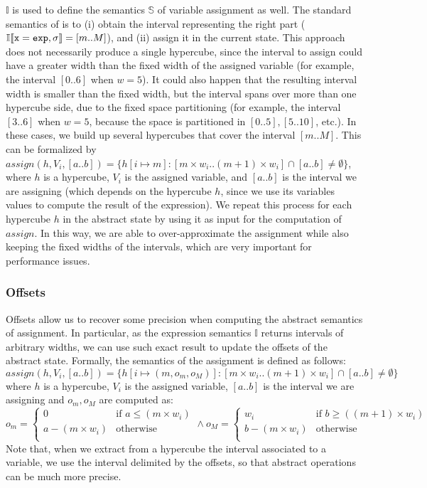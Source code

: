 $\mathbb{I}$ is used to define the semantics $\mathbb{S}$ of variable assignment as well. The standard semantics of  is to (i) obtain the interval representing the right part ($\mathbb{I}\llbracket\mathtt{x=exp}, \sigma\rrbracket=[m..M]$), and (ii) assign it in the current state. This approach does not necessarily produce a single hypercube, since the interval to assign could have a greater width than the fixed width of the assigned variable (for example, the interval $[0..6]$ when $w=5$). It could also happen that the resulting interval width is smaller than the fixed width, but the interval spans over more than one hypercube side, due to the fixed space partitioning (for example, the interval $[3..6]$ when $w=5$, because the space is partitioned in $[0..5],[5..10]$, etc.). In these cases, we build up several hypercubes that cover the interval $[m..M]$. This can be formalized by $assign(h, V_i, [a..b])=\{h[i\mapsto m] : [m\times w_i .. (m+1)\times w_i]\cap [a..b] \neq \emptyset\}$, where $h$ is a hypercube, $V_i$ is the assigned variable, and $[a..b]$ is the interval we are assigning (which depends on the hypercube $h$, since we use its variables values to compute the result of the expression). We repeat this process for each hypercube $h$ in the abstract state by using it as input for the computation of $assign$.
In this way, we are able to over-approximate the assignment while also keeping the fixed widths of the intervals, which are very important for performance issues.

\vspace{-10pt}
\subsubsection{Offsets}
Offsets allow us to recover some precision when computing the abstract semantics of assignment. In particular, as the expression semantics $\mathbb{I}$ returns intervals of arbitrary widths, we can use such exact result to update the offsets of the abstract state. Formally, the semantics of the assignment is defined as follows: 
\begin{equation*}
assign(h, V_i, [a..b]) = \{ h[i\mapsto (m,o_m,o_M)] : [m\times w_i .. (m+1)\times w_i] \cap [a..b] \neq \emptyset \}
\end{equation*}
where $h$ is a hypercube, $V_i$ is the assigned variable, $[a..b]$ is the interval we are assigning and $o_m, o_M$ are computed as:
\begin{equation*}
o_m = \begin{cases} 
0 & \mbox{if } a \leq (m \times w_i) \\
a - (m \times w_i) & \mbox{otherwise} \\
\end{cases} \wedge 
o_M = \begin{cases} 
w_i & \mbox{if } b \geq ((m+1) \times w_i) \\
b - (m \times w_i) & \mbox{otherwise} \\
\end{cases}
\end{equation*}
Note that, when we extract from a hypercube the interval associated to a variable, we use the interval delimited by the offsets, so that abstract operations can be much more precise. 


